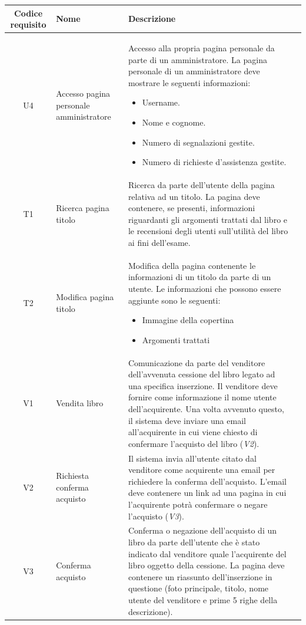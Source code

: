 \documentclass[10pt,a4paper]{report}
\begin{document}
	\begin{tabular}{cp{3cm}p{9cm}p{1cm}}
		Codice requisito&Nome&Descrizione\\ \hline
		U4&Accesso pagina personale amministratore&Accesso alla propria pagina personale da parte di un amministratore. La pagina personale di un amministratore deve mostrare le seguenti informazioni:
		\begin{itemize}
			\item Username.
			\item Nome e cognome.
			\item Numero di segnalazioni gestite.
			\item Numero di richieste d'assistenza gestite.
		\end{itemize}\\ \hline
		T1&Ricerca pagina titolo&Ricerca da parte dell'utente della pagina relativa ad un titolo. La pagina deve contenere, se presenti, informazioni riguardanti gli argomenti trattati dal libro e le recensioni degli utenti sull'utilità del libro ai fini dell'esame.\\ \hline
		T2&Modifica pagina titolo&Modifica della pagina contenente le informazioni di un titolo da parte di un utente. Le informazioni che possono essere aggiunte sono le seguenti:
		\begin{itemize}
			\item Immagine della copertina
			\item Argomenti trattati
		\end{itemize}\\ \hline
		V1&Vendita libro&Comunicazione da parte del venditore dell'avvenuta cessione del libro legato ad una specifica inserzione. Il venditore deve fornire come informazione il nome utente dell'acquirente. Una volta avvenuto questo, il sistema deve inviare una email all'acquirente in cui viene chiesto di confermare l'acquisto del libro (\textit{V2}).\\ \hline
		V2&Richiesta conferma acquisto&Il sistema invia all'utente citato dal venditore come acquirente una email per richiedere la conferma dell'acquisto. L'email deve contenere un link ad una pagina in cui l'acquirente potrà confermare o negare l'acquisto (\textit{V3}).\\ \hline
		V3&Conferma acquisto&Conferma o negazione dell'acquisto di un libro da parte dell'utente che è stato indicato dal venditore quale l'acquirente del libro oggetto della cessione. La pagina deve contenere un riassunto dell'inserzione in questione (foto principale, titolo, nome utente del venditore e prime 5 righe della descrizione).

\end{tabular}
\end{document}
